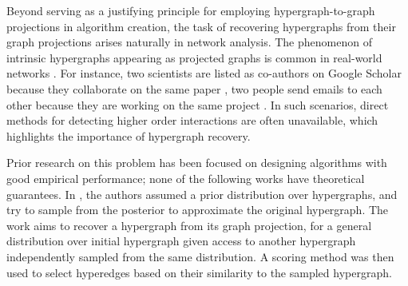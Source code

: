 

Beyond serving as a justifying principle for employing hypergraph-to-graph projections in algorithm creation, the task of recovering hypergraphs from their graph projections arises naturally in network analysis. 
The phenomenon of intrinsic hypergraphs appearing as projected graphs is common in real-world networks \cite{zhou2006learning,latapy2008basic,williamson2020random,battiston2020networks}. For instance, two scientists are listed as co-authors on Google Scholar because they collaborate on the same paper \cite{newman2004coauthorship}, two people send emails to each other because they are working on the same project \cite{klimt2004introducing}. In such scenarios, direct methods for detecting higher order interactions are often unavailable, which highlights the importance of hypergraph recovery.

Prior research on this problem has been focused on designing algorithms with good empirical performance; none of the following works have theoretical guarantees. In \cite{young2021hypergraph,lizotte2023hypergraph}, the authors assumed a prior distribution over hypergraphs, and try to sample from the posterior to approximate the original hypergraph. 
The work \cite{wang2022supervised} aims to recover a hypergraph from its graph projection, for a general distribution over initial hypergraph given access to another hypergraph independently sampled from the same distribution. A scoring method was then used to select hyperedges based on their similarity to the sampled hypergraph. 


